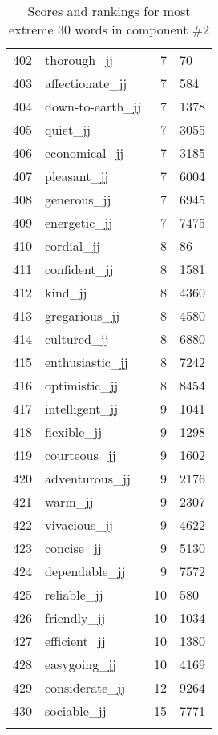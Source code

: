 \begin{longtable}[!htbp]{| rlr@{.}l |}
    402 & thorough\_jj & 7 & 70 \\
    403 & affectionate\_jj & 7 & 584 \\
    404 & down-to-earth\_jj & 7 & 1378 \\
    405 & quiet\_jj & 7 & 3055 \\
    406 & economical\_jj & 7 & 3185 \\
    407 & pleasant\_jj & 7 & 6004 \\
    408 & generous\_jj & 7 & 6945 \\
    409 & energetic\_jj & 7 & 7475 \\
    410 & cordial\_jj & 8 & 86 \\
    411 & confident\_jj & 8 & 1581 \\
    412 & kind\_jj & 8 & 4360 \\
    413 & gregarious\_jj & 8 & 4580 \\
    414 & cultured\_jj & 8 & 6880 \\
    415 & enthusiastic\_jj & 8 & 7242 \\
    416 & optimistic\_jj & 8 & 8454 \\
    417 & intelligent\_jj & 9 & 1041 \\
    418 & flexible\_jj & 9 & 1298 \\
    419 & courteous\_jj & 9 & 1602 \\
    420 & adventurous\_jj & 9 & 2176 \\
    421 & warm\_jj & 9 & 2307 \\
    422 & vivacious\_jj & 9 & 4622 \\
    423 & concise\_jj & 9 & 5130 \\
    424 & dependable\_jj & 9 & 7572 \\
    425 & reliable\_jj & 10 & 580 \\
    426 & friendly\_jj & 10 & 1034 \\
    427 & efficient\_jj & 10 & 1380 \\
    428 & easygoing\_jj & 10 & 4169 \\
    429 & considerate\_jj & 12 & 9264 \\
    430 & sociable\_jj & 15 & 7771 \\
    \hline
    \caption{Scores and rankings for most extreme 30 words in component \#2} \\
\end{longtable}
